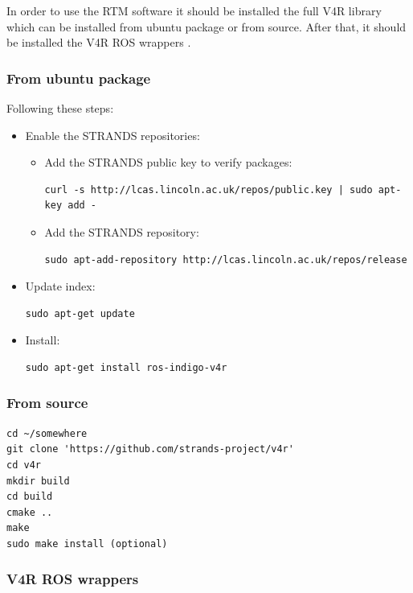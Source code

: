 \documentclass[12pt,a4paper,final,twoside,openright]{report}
\begin{document}
In order to use the RTM software it should be installed the full V4R library which can  be installed from ubuntu package or from source. After that, it should be installed the V4R ROS wrappers \cite{gitV4RWrappers}.

\subsubsection{From ubuntu package}
	
Following these steps:

\begin{itemize}
\item Enable the STRANDS repositories:
\begin{itemize}
\item Add the STRANDS public key to verify packages: 
\begin{lstlisting}[language=Git]
curl -s http://lcas.lincoln.ac.uk/repos/public.key | sudo apt-key add -
\end{lstlisting}
\item Add the STRANDS repository:  
\begin{lstlisting}[language=Git]
sudo apt-add-repository http://lcas.lincoln.ac.uk/repos/release
\end{lstlisting}
\end{itemize}
\item Update index:
\begin{lstlisting}[language=Git]
sudo apt-get update
\end{lstlisting}
\item Install:
\begin{lstlisting}[language=Git]
sudo apt-get install ros-indigo-v4r
\end{lstlisting}
\end{itemize}

\subsubsection{From source}

\begin{lstlisting}[language=Git]
cd ~/somewhere
git clone 'https://github.com/strands-project/v4r'
cd v4r
mkdir build
cd build
cmake ..
make
sudo make install (optional)
\end{lstlisting}

\subsubsection{V4R ROS wrappers}
\end{document}
